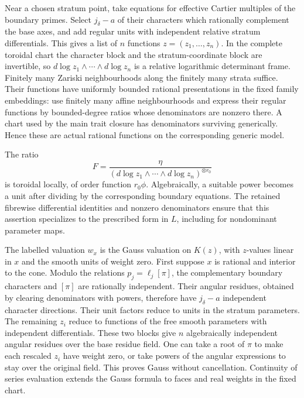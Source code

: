 Near a chosen stratum point, take equations for effective
Cartier multiples of the boundary primes.  Select
\(j_\delta-a\) of their characters which rationally complement
the base axes, and add regular units with independent
relative stratum differentials.  This gives a list of
\(n\) functions \(z=(z_1,\ldots,z_n)\).  In the complete
toroidal chart the character block and the stratum-coordinate
block are invertible, so
\(d\log z_1\wedge\cdots\wedge d\log z_n\) is a relative
logarithmic determinant frame.  Finitely many Zariski
neighbourhoods along the finitely many strata suffice.
Their functions have uniformly bounded rational
presentations in the fixed family embeddings: use finitely
many affine neighbourhoods and express their regular
functions by bounded-degree ratios whose denominators are
nonzero there.  A chart used by the main trait closure has
denominators surviving generically.  Hence these are actual
rational functions on the corresponding generic model.

The ratio
\begin{equation}
 F=\frac{\eta}
 {(d\log z_1\wedge\cdots\wedge d\log z_n)^{\otimes r_0}}
 \label{trait:frame-ratio}
\end{equation}
is toroidal locally, of order function \(r_0\phi\).  Algebraically,
a suitable power becomes a unit after dividing by the
corresponding boundary equations.  The retained fibrewise
differential identities and nonzero denominators ensure
that this assertion specializes to the prescribed form in
\(L\), including for nondominant parameter maps.

The labelled valuation \(w_x\) is the Gauss valuation on
\(K(z)\), with \(z\)-values linear in \(x\) and the smooth
units of weight zero.  First suppose \(x\) is rational and
interior to the cone.  Modulo the relations
\(p_j=\ell_j[\pi]\), the complementary boundary characters
and \([\pi]\) are rationally independent.  Their angular
residues, obtained by clearing denominators with powers,
therefore have \(j_\delta-a\) independent character
directions.  Their unit factors reduce to units in the
stratum parameters.  The remaining \(z_i\) reduce to
functions of the free smooth parameters with independent
differentials.  These two blocks give \(n\) algebraically
independent angular residues over the base residue field.
One can take a root of \(\pi\) to make each rescaled \(z_i\)
have weight zero, or take powers of the angular expressions
to stay over the original field.  This proves Gauss without
cancellation.  Continuity of series evaluation extends the
Gauss formula to faces and real weights in the fixed chart.

